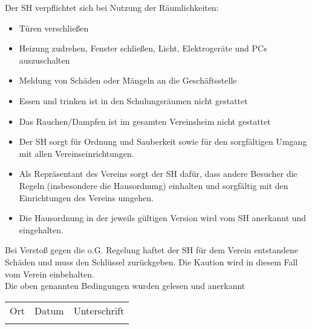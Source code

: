 \begin{Form}
	Der SH verpflichtet sich bei Nutzung der Räumlichkeiten:
	\begin{itemize}
		\setlength{\itemsep}{-5pt}
		\item Türen verschließen
		\item Heizung zudrehen, Fenster schließen, Licht, Elektrogeräte und PCs auszuschalten
		\item Meldung von Schäden oder Mängeln an die Geschäftsstelle
		\item Essen und trinken ist in den Schulungsräumen nicht gestattet
		\item Das Rauchen/Dampfen ist im gesamten Vereinsheim nicht gestattet
		\item Der SH sorgt für Ordnung und Sauberkeit sowie für den sorgfältigen Umgang mit allen Vereinseinrichtungen.
		\item Als Repräsentant des Vereins sorgt der SH dafür, dass andere Besucher die Regeln (insbesondere die Hausordnung) einhalten und sorgfältig mit den Einrichtungen des Vereins umgehen.
		\item Die Hausordnung in der jeweils gültigen Version wird vom SH anerkannt und eingehalten.
	\end{itemize}
	Bei Verstoß gegen die o.G. Regelung haftet der SH für dem Verein entstandene Schäden und muss den Schlüssel zurückgeben. Die Kaution wird in diesem Fall vom Verein einbehalten.\\
	
	Die oben genannten Bedingungen wurden gelesen und anerkannt\\
	
	\begin{tabu}{XXX[2]}
		Ort & Datum & Unterschrift \\
		\TextField[name=SIGN_ORT]{} & \TextField[name=SIGN_DATUM]{} & \TextField[name=SIGN]{} \\
	\end{tabu}
	
	
\end{Form}
